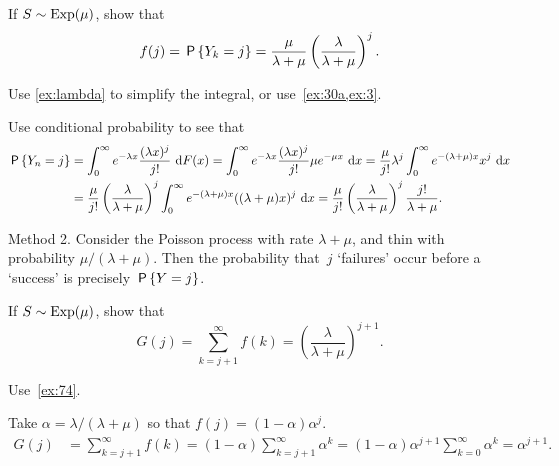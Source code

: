 \documentclass[stochastic-or.tex]{subfiles}
\begin{document}
\begin{exercise}\label{ex:74}
 If $S\sim \Exp{\mu}$, show that
 \begin{equation*}
f(j) = \P{Y_k = j} = \frac{\mu}{\lambda+\mu}\left(\frac{\lambda}{\lambda+\mu}\right)^j.
 \end{equation*}
\begin{hint}
Use \cref{ex:lambda} to simplify the integral, or use~\cref{ex:30a,ex:3}.
\end{hint}
\begin{solution}
Use conditional probability to see that
\begin{align*}
 \P{Y_n = j}
&= \int_0^\infty e^{-\lambda x}\frac{(\lambda x)^j}{j!}\, \d F( x) = \int_0^\infty e^{-\lambda x}\frac{(\lambda x)^j}{j!} \mu e^{-\mu x}\, \d x
= \frac{\mu}{j!}\lambda^j \int_0^\infty e^{-(\lambda+\mu) x}x^j\,\d x \\
&= \frac{\mu}{j!}\left(\frac{\lambda}{\lambda+\mu}\right)^j \int_0^\infty e^{-(\lambda+\mu) x}((\lambda+\mu)x)^j\,\d x = \frac{\mu}{j!}\left(\frac{\lambda}{\lambda+\mu}\right)^j \frac{j!}{\lambda+\mu}.
\end{align*}

Method 2. Consider the Poisson process with rate $\lambda+\mu$, and thin with probability $\mu/(\lambda+\mu)$. Then the probability that~$j$ `failures' occur before a `success' is precisely $\P{Y=j}$.
\end{solution}
\end{exercise}

\begin{exercise}\label{ex:l-225}
 If $S\sim \Exp{\mu}$, show that
 \begin{equation*}
G(j) = \sum_{k=j+1}^\infty f(k) = \left(\frac{\lambda}{\lambda+\mu}\right)^{j+1}.
 \end{equation*}
\begin{hint}
 Use~\cref{ex:74}.
\end{hint}
\begin{solution}
 Take $\alpha = \lambda/(\lambda+\mu)$ so that
 $f(j) = (1-\alpha) \alpha^j$.
\begin{align*}
 G(j)
&= \sum_{k=j+1}^\infty f(k) = (1-\alpha) \sum_{k=j+1}^\infty \alpha^k  = (1-\alpha) \alpha^{j+1}\sum_{k=0}^\infty \alpha^{k} = \alpha^{j+1}.
\end{align*}
\end{solution}
\end{exercise}
\end{document}
